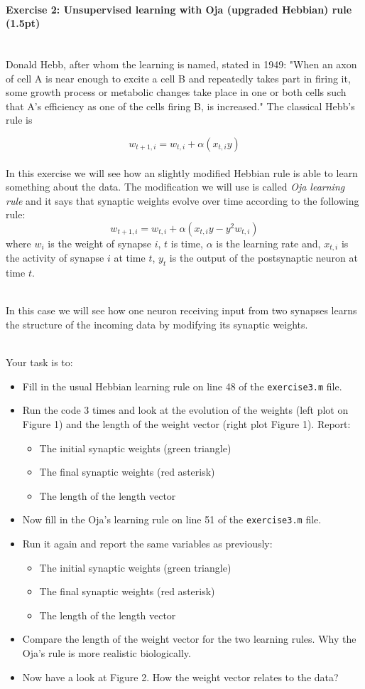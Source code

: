 \documentclass[a4paper,11pt]{article}
\newenvironment{exercise}[3]{\paragraph{Exercise #1: #2 (#3pt)}\ \\}{
\medskip}
\begin{document}
%
% 
%
\begin{exercise}{2}{Unsupervised learning with Oja (upgraded Hebbian) rule}{1.5}
Donald Hebb, after whom the learning is named, stated in 1949: "When an axon of cell A is near enough to excite a cell B and repeatedly takes part in firing it, some growth process or metabolic changes take place in one or both cells such that A's efficiency as one of the cells firing B, is increased." The classical Hebb's rule is

$$w_{t+1, i} = w_{t, i} + \alpha (x_{t, i} y)$$
\ \\
In this exercise we will see how an slightly modified Hebbian rule is able to learn something about the data. The modification we will use is called \emph{Oja learning rule} and it says that synaptic weights evolve over time according to the following rule:
$$w_{t+1, i} = w_{t, i} + \alpha (x_{t, i} y - y^2 w_{t,i})$$
where $w_i$ is the weight of synapse $i$, $t$ is time, $\alpha$ is the learning rate and, $x_{t, i}$ is the activity of synapse $i$ at time $t$, $y_t$ is the output of the postsynaptic neuron at time $t$.

\ \\
In this case we will see how one neuron receiving input from two synapses learns the structure of the incoming data by modifying its synaptic weights.

\ \\
Your task is to:
\begin{itemize}
	\item Fill in the usual Hebbian learning rule on line 48 of the \texttt{exercise3.m} file.
	\item Run the code 3 times and look at the evolution of the weights (left plot on Figure 1) and the length of the weight vector (right plot Figure 1). Report:
		\begin{itemize}
			\item The initial synaptic weights (green triangle)
			\item The final synaptic weights (red asterisk)
			\item The length of the length vector 
		\end{itemize}
	\item Now fill in the Oja's learning rule on line 51 of the \texttt{exercise3.m} file.
	\item Run it again and report the same variables as previously:
		\begin{itemize}
			\item The initial synaptic weights (green triangle)
			\item The final synaptic weights (red asterisk)
			\item The length of the length vector 
		\end{itemize}
	\item Compare the length of the weight vector for the two learning rules. Why the Oja's rule is more realistic biologically.
	\item Now have a look at Figure 2. How the weight vector relates to the data?
\end{itemize}
\end{exercise}
\end{document}
